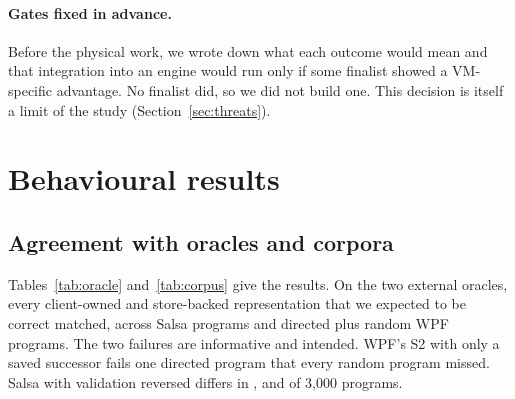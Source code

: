 \documentclass[11pt]{article}
\begin{document}
\paragraph{Gates fixed in advance.} Before the physical work, we wrote down what each outcome would mean and that integration into an engine would run only if some finalist showed a VM-specific advantage. No finalist did, so we did not build one. This decision is itself a limit of the study (Section~\ref{sec:threats}).

\section{Behavioural results}
\label{sec:behaviour}

\subsection{Agreement with oracles and corpora}

Tables~\ref{tab:oracle} and~\ref{tab:corpus} give the results. On the two external oracles, every client-owned and store-backed representation that we expected to be correct matched, across \salsaTotalPrograms{} Salsa programs and \wpfDirectedTotal{} directed plus \wpfRandom{} random WPF programs. The two failures are informative and intended. WPF's S2 with only a saved successor fails one directed program that every random program missed. Salsa with validation reversed differs in \salsaReverseGenerated{}, \salsaReverseHoldout{} and \salsaReverseFresh{} of 3{,}000 programs.

\begin{table}[tbp]
\centering
\footnotesize

\caption{Agreement with external executables. Each cell is the number of programs whose logs match the oracle, of those run. WPF's directed programs include 10 on handler lifetime, and Salsa's include 9 trace shapes. For Salsa, the first two random corpora were used to find a defect, so the fresh corpus is the independent check.}
\label{tab:oracle}
\end{table}

\begin{table}[tbp]
\centering
\footnotesize

\caption{Signal runtimes. ``Corpus'' is the client's own tests. ``Differ'' is the number of random public-API programs that differ from the named reference, in the single search for Alien, and for the polyfill in the lanes without (1) and with (2) throwing hooks. In lane (2), the differences of the port and of the two permanent-relation variants occur only in programs where a hook threw. The stable-erase variant differs in sink order from the frozen polyfill by construction.}
\label{tab:corpus}
\end{table}
\end{document}
